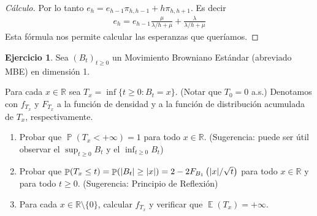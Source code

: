 \documentclass{article}
\DeclareMathOperator{\prob}{\mathbb{P}}
\DeclareMathOperator{\Expectation}{\mathbb{E}}
\newcommand{\realnum}{\mathbb{R}}
\theoremstyle{definition}
\newtheorem{exercise}{Ejercicio}
\begin{document}
\begin{proof}[Cálculo]
Por lo tanto \(e_h = e_{h - 1} \pi_{h, h - 1} + h \pi_{h, h + 1}\).
Es decir
\begin{align}
	e_h = e_{h - 1} \frac{\mu}{\lambda / h + \mu} + \frac{\lambda}{\lambda / h + \mu}
\end{align}
Esta fórmula nos permite calcular las esperanzas que queríamos.
\end{proof}
\endgroup
\newpage
\begingroup
\newcommand{\events}{\mathcal{F}}
\newcommand{\brownian}{B}
\newcommand{\brownianProcess}{(\brownian_t)_{t \geq 0}}
\newcommand{\reflectedBrownian}{\widetilde{\brownian}}
\newcommand{\wiener}{W}
\newcommand{\wienerProcess}{(\wiener_t)_{t \geq 0}}
\begin{exercise}
Sea $\brownianProcess$ un Movimiento Browniano Estándar (abreviado MBE) en dimensión 1.

Para cada $x \in \realnum$ sea $T_x = \inf \{t \geq 0 : \brownian_t = x\}$.
(Notar que \(T_0 = 0\) a.s.)
Denotamos con \(f_{T_x}\) y \(F_{T_x}\) a la función de densidad y a la función de distribución acumulada de \(T_x\), respectivamente.
\begin{enumerate}[label=\alph*), ref=\theexercise.\labelenumi]
	\item \label{exercise:3.a)} 
	Probar que \(\prob(T_x < + \infty) = 1\) para todo \(x \in \realnum\).
	(Sugerencia: puede ser útil observar el \(\sup_{t \geq 0} \brownian_t\) y el \(\inf_{t \geq 0} \brownian_t\))
	\item \label{exercise:3.b)}
	Probar que \(\prob(T_x \leq t) = \prob(\abs{\brownian_t} \geq \abs{x}) = 2 - 2 F_{\brownian_1} \left( \abs{x} / \sqrt{t} \right)\) para todo \(x \in \realnum\) y para todo \(t \geq 0\).
	(Sugerencia: Principio de Reflexión)
	\item Para cada \(x \in \realnum \setminus \{0\}\), calcular \(f_{T_x}\) y verificar que \(\Expectation(T_x) = + \infty\).
\end{enumerate}
\end{exercise}
\end{document}
